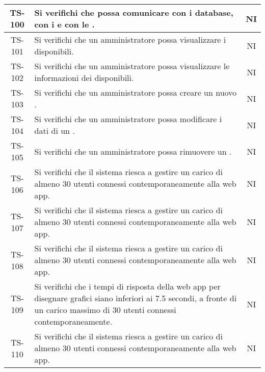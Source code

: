 \begin{center}
\begin{longtable}{|c|p{10cm}|c|}
			 \hline
			 TS-100 & Si verifichi che \glock{Kafka} possa comunicare con i database, con i \glock{gateway} e con le \glock{API}. & NI \\
			 \hline
			 TS-101 & Si verifichi che un amministratore possa visualizzare i \glock{gateway} disponibili. & NI \\
			 \hline
			 TS-102 & Si verifichi che un amministratore possa visualizzare le informazioni dei \glock{gateway} disponibili. & NI \\
			 \hline
			 TS-103 & Si verifichi che un amministratore possa creare un nuovo \glock{gateway}. & NI \\
			 \hline
			 TS-104 & Si verifichi che un amministratore possa modificare i dati di un \glock{gateway}. & NI \\
			 \hline
			 TS-105 & Si verifichi che un amministratore possa rimuovere un \glock{gateway}. & NI \\
			 \hline
			 TS-106 & Si verifichi che il sistema riesca a gestire un carico di almeno 30 utenti connessi contemporaneamente alla web app. & NI \\
			 \hline
			 TS-107 & Si verifichi che il sistema riesca a gestire un carico di almeno 30 utenti connessi contemporaneamente alla web app. & NI \\
			 \hline
			 TS-108 & Si verifichi che il sistema riesca a gestire un carico di almeno 30 utenti connessi contemporaneamente alla web app. & NI \\
			 \hline
			 TS-109 & Si verifichi che i tempi di risposta della web app per disegnare grafici siano inferiori ai 7.5 secondi, a fronte di un carico massimo di 30 utenti connessi contemporaneamente. & NI \\
			 \hline
			 TS-110 & Si verifichi che il sistema riesca a gestire un carico di almeno 30 utenti connessi contemporaneamente alla web app. & NI \\
			 \hline

\end{longtable}
\end{center}
